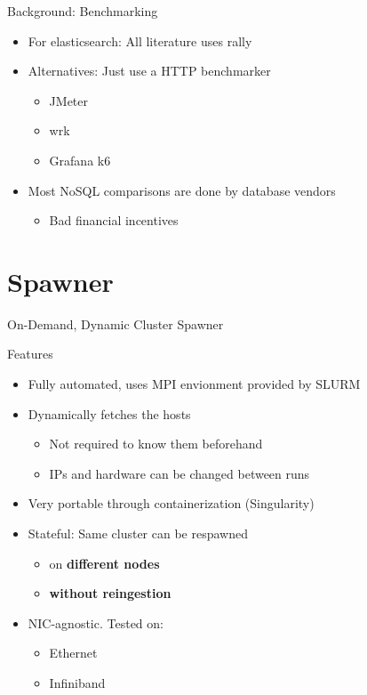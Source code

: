 \documentclass[compress,aspectratio=169]{beamer}
\begin{document}
  \begin{frame}{Background: Benchmarking}
    \begin{itemize}
      \item For elasticsearch: All literature uses rally
      \item Alternatives: Just use a HTTP benchmarker
        \begin{itemize}
          \item JMeter
          \item wrk
          \item Grafana k6
        \end{itemize}
      \item Most NoSQL comparisons are done by database vendors
        \begin{itemize}
          \item Bad financial incentives
        \end{itemize}
    \end{itemize}
  \end{frame}

	\section{Spawner}
	\begin{frame}{On-Demand, Dynamic Cluster Spawner}
    \begin{block}{Features}
      \pause
      \begin{itemize}
        \item Fully automated, uses MPI envionment provided by SLURM
          \pause
        \item Dynamically fetches the hosts
          \begin{itemize}
            \item Not required to know them beforehand
            \item IPs and hardware can be changed between runs
          \end{itemize}
          \pause
        \item Very portable through containerization (Singularity)
          \pause
        \item Stateful: Same cluster can be respawned 
          \begin{itemize}
            \item on \textbf{different nodes}
            \item \textbf{without reingestion}
          \end{itemize}
          \pause
        \item NIC-agnostic. Tested on:
          \begin{itemize}
            \item Ethernet
            \item Infiniband
          \end{itemize}
      \end{itemize}
    \end{block}
	\end{frame}
\end{document}
